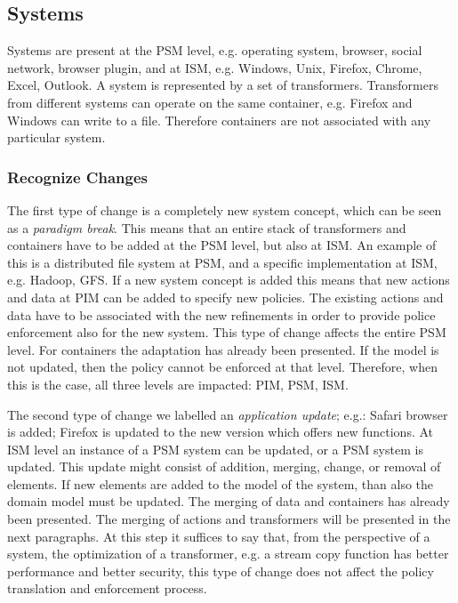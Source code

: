 \documentclass{sig-alternate}
\begin{document}
\subsection{Systems}
Systems are present at the PSM level, e.g. operating system, browser, social network, browser plugin, 
and at ISM, e.g. Windows, Unix, Firefox, Chrome, Excel, Outlook.
A system is represented by a set of transformers.
Transformers from different systems can operate on the same container,
e.g. Firefox and Windows can write to a file. Therefore containers are not associated with any particular system.
\subsubsection{Recognize Changes}
The first type of change is a completely new system concept, which can be seen as a \textit{paradigm break}. 
This means that an entire stack of transformers and containers have to be added at the PSM level, but also at ISM.
An example of this is a distributed file system at PSM, and a specific implementation at ISM, e.g. Hadoop, GFS.
If a new system concept is added this means that new actions and data at PIM can be added to specify new policies.
The existing actions and data have to be associated with the new refinements in order to provide police enforcement also for the new system.
This type of change affects the entire PSM level. For containers the adaptation has already been presented. 
If the model is not updated, then the policy cannot be enforced at that level.
Therefore, when this is the case, all three levels are impacted: PIM, PSM, ISM.

The second type of change we labelled an \textit{application update};
e.g.: Safari browser is added; Firefox is updated to the new version which offers new functions.
At ISM level an instance of a PSM system can be updated, or a PSM system is updated.
This update might consist of addition, merging, change, or removal of elements.
If new elements are added to the model of the system, than also the domain model must be updated.
The merging of data and containers has already been presented.
The merging of actions and transformers will be presented in the next paragraphs.
At this step it suffices to say that, from the perspective of a system, the optimization of a transformer,
e.g. a stream copy function has better performance and better security,
this  type  of  change  does  not  affect  the  policy translation and enforcement process.
\end{document}
